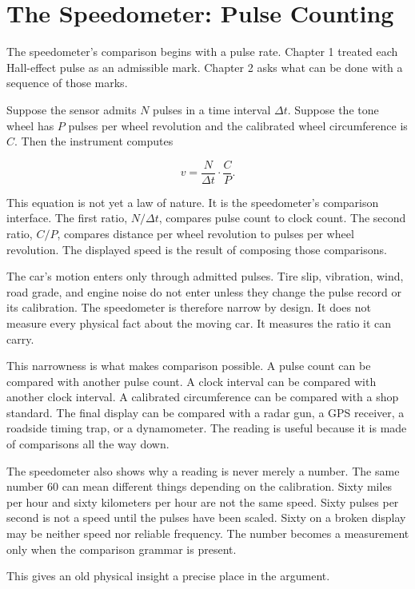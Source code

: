 \section{The Speedometer: Pulse Counting}
\label{se:the-speedometer-pulse-counting}

The speedometer's comparison begins with a pulse rate. Chapter 1 treated each
Hall-effect pulse as an admissible mark. Chapter 2 asks what can be done with a
sequence of those marks.

Suppose the sensor admits $N$ pulses in a time interval $\Delta t$. Suppose the
tone wheel has $P$ pulses per wheel revolution and the calibrated wheel
circumference is $C$. Then the instrument computes

\[
v = \frac{N}{\Delta t}\cdot\frac{C}{P}.
\]

This equation is not yet a law of nature. It is the speedometer's comparison
interface. The first ratio, $N/\Delta t$, compares pulse count to clock count.
The second ratio, $C/P$, compares distance per wheel revolution to pulses per
wheel revolution. The displayed speed is the result of composing those
comparisons.

The car's motion enters only through admitted pulses. Tire slip, vibration,
wind, road grade, and engine noise do not enter unless they change the pulse
record or its calibration. The speedometer is therefore narrow by design. It
does not measure every physical fact about the moving car. It measures the
ratio it can carry.

This narrowness is what makes comparison possible. A pulse count can be
compared with another pulse count. A clock interval can be compared with another
clock interval. A calibrated circumference can be compared with a shop standard.
The final display can be compared with a radar gun, a GPS receiver, a roadside
timing trap, or a dynamometer. The reading is useful because it is made of
comparisons all the way down.

The speedometer also shows why a reading is never merely a number. The same
number 60 can mean different things depending on the calibration. Sixty miles
per hour and sixty kilometers per hour are not the same speed. Sixty pulses per
second is not a speed until the pulses have been scaled. Sixty on a broken
display may be neither speed nor reliable frequency. The number becomes a
measurement only when the comparison grammar is present.

This gives an old physical insight a precise place in the argument.

